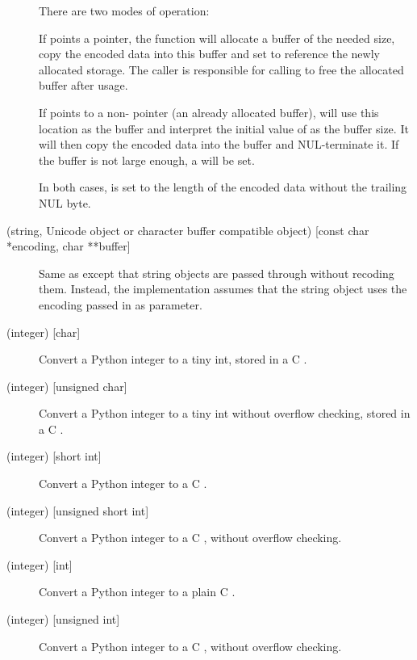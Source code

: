 \begin{description}
  There are two modes of operation:

  If  points a \NULL{} pointer, the function will
  allocate a buffer of the needed size, copy the encoded data into
  this buffer and set  to reference the newly allocated
  storage.  The caller is responsible for calling
   to free the allocated buffer after usage.

  If  points to a non-\NULL{} pointer (an already
  allocated buffer),  will use this
  location as the buffer and interpret the initial value of
   as the buffer size.  It will then copy the
  encoded data into the buffer and NUL-terminate it.  If the buffer
  is not large enough, a  will be set.

  In both cases,  is set to the length of the
  encoded data without the trailing NUL byte.

  \item[\samp{et\#} (string, Unicode object or character buffer compatible
  object) {[const char *encoding, char **buffer]}]
  Same as  except that string objects are passed through
  without recoding them. Instead, the implementation assumes that the
  string object uses the encoding passed in as parameter.

  \item[\samp{b} (integer) {[char]}]
  Convert a Python integer to a tiny int, stored in a C .

  \item[\samp{B} (integer) {[unsigned char]}]
  Convert a Python integer to a tiny int without overflow checking,
  stored in a C . 

  \item[\samp{h} (integer) {[short int]}]
  Convert a Python integer to a C .

  \item[\samp{H} (integer) {[unsigned short int]}]
  Convert a Python integer to a C , without
  overflow checking.  

  \item[\samp{i} (integer) {[int]}]
  Convert a Python integer to a plain C .

  \item[\samp{I} (integer) {[unsigned int]}]
  Convert a Python integer to a C , without
  overflow checking.  


\end{description}
